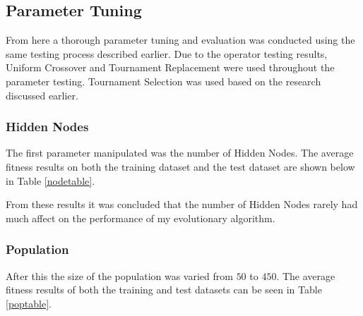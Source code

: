 \documentclass[sigconf]{acmart}
\begin{document}
\subsection{Parameter Tuning}
From here a thorough parameter tuning and evaluation was conducted using the same testing process described earlier. Due to the operator testing results, Uniform Crossover and Tournament Replacement were used throughout the parameter testing. Tournament Selection was used based on the research discussed earlier.

\subsubsection{Hidden Nodes}
The first parameter manipulated was the number of Hidden Nodes. The average fitness results on both the training dataset and the test dataset are shown below in Table \ref{nodetable}.

\begin{table}[!h]
	\caption{Number of Hidden Nodes Comparison}
	\label{nodetable}
	\centering
\end{table}

From these results it was concluded that the number of Hidden Nodes rarely had much affect on the performance of my evolutionary algorithm.

\subsubsection{Population}
After this the size of the population was varied from $50$ to $450$. The average fitness results of both the training and test datasets can be seen in Table \ref{poptable}.
\end{document}
